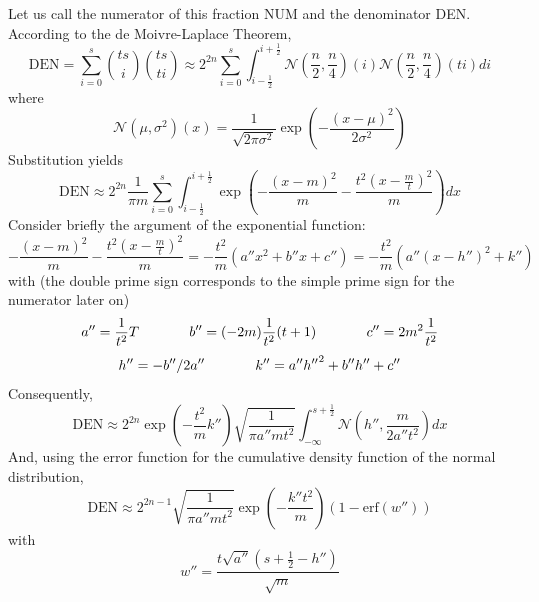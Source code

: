 \documentclass[smallextended]{svjour3}       %
\newcommand{\erf}[0]{\mbox{erf}}
\newcommand{\aden}[0]{a''}
\newcommand{\bden}[0]{b''}
\newcommand{\cden}[0]{c''}
\newcommand{\hden}[0]{h''}
\newcommand{\kden}[0]{k''}
\newcommand{\wden}[0]{w''}
\begin{document}
Let us call the numerator of this fraction NUM and the denominator
DEN. According to the de Moivre-Laplace Theorem,
\begin{displaymath}
  \mbox{DEN}=\sum_{i=0}^{s}\binom{ts}{i}\binom{ts}{ti}\approx{}2^{2n}\sum_{i=0}^{s}\int_{i-\frac{1}{2}}^{i+\frac{1}{2}}\mathcal{N}(\frac{n}{2},\frac{n}{4})(i)\mathcal{N}(\frac{n}{2},\frac{n}{4})(ti)di
\end{displaymath}
where
\begin{displaymath}
  \mathcal{N}(\mu,\sigma^{2})(x)=\frac{1}{\sqrt{2\pi\sigma^{2}}}\exp\left(-\frac{(x-\mu)^{2}}{2\sigma^{2}}\right)
\end{displaymath}
Substitution yields
\begin{displaymath}
  \mbox{DEN}\approx{}2^{2n}\frac{1}{\pi{}m}\sum_{i=0}^{s}\int_{i-\frac{1}{2}}^{i+\frac{1}{2}}\exp\left(-\frac{\left(x-m\right)^{2}}{m}-\frac{t^{2}\left(x-\frac{m}{t}\right)^{2}}{m}\right)dx
\end{displaymath}
Consider briefly the argument of the exponential function:
\begin{displaymath}
  -\frac{\left(x-m\right)^{2}}{m}-\frac{t^{2}\left(x-\frac{m}{t}\right)^{2}}{m}=-\frac{t^{2}}{m}({\aden}x^{2}+{\bden}x+{\cden})=-\frac{t^{2}}{m}\left({\aden}(x-{\hden})^{2}+{\kden}\right)
\end{displaymath}
with (the double prime sign corresponds to the simple prime sign for
the numerator later on)
\begin{displaymath}
{\aden}=\frac{1}{t^{2}}{T}\notag\hspace{.5in}
{\bden}=(-2m)\frac{1}{t^{2}}(t+1)\hspace{.5in}
{\cden}=2m^{2}\frac{1}{t^{2}}
\end{displaymath}
\begin{displaymath}
{\hden}=-{\bden}/2{\aden}\hspace{.5in}
{\kden}={\aden}{\hden}^{2}+{\bden}{\hden}+{\cden}
\end{displaymath}
Consequently,
\begin{displaymath}
\mbox{DEN}\approx{}2^{2n}\exp\left(-\frac{t^{2}}{m}{\kden}\right)\sqrt{\frac{1}{\pi{}{\aden}mt^{2}}}\int_{-\infty}^{s+\frac{1}{2}}\mathcal{N}\left({\hden},\frac{m}{2{\aden}t^{2}}\right)dx
\end{displaymath}
And, using the error function for the cumulative density function of
the normal distribution,
\begin{equation}
  \label{eq:den}
  \mbox{DEN}\approx{}2^{2n-1}\sqrt{\frac{1}{\pi{}{\aden}mt^{2}}}\exp\left(-\frac{{\kden}t^{2}}{m}\right)\left(1-\erf({\wden})\right)
\end{equation}
with
\begin{displaymath}
  {\wden}=\frac{t\sqrt{{\aden}}\left(s+\frac{1}{2}-{\hden}\right)}{\sqrt{m}}
\end{displaymath}
\end{document}
